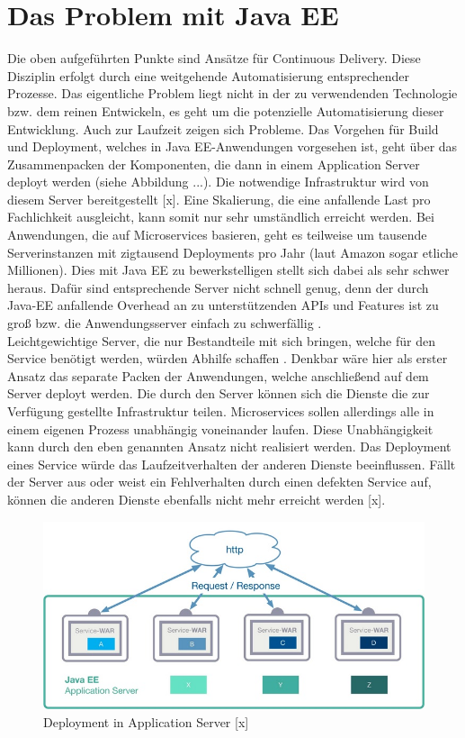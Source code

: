 \section{Das Problem mit Java EE}
Die oben aufgeführten Punkte sind Ansätze für Continuous Delivery. Diese Disziplin erfolgt durch eine weitgehende Automatisierung entsprechender Prozesse. Das eigentliche Problem liegt nicht in der zu verwendenden Technologie bzw. dem reinen Entwickeln, es geht um die potenzielle Automatisierung dieser Entwicklung. Auch zur Laufzeit zeigen sich Probleme. Das Vorgehen für Build und Deployment, welches in Java EE-Anwendungen vorgesehen ist, geht über das Zusammenpacken der Komponenten, die dann in einem Application Server deployt werden (siehe Abbildung ...). Die notwendige Infrastruktur wird von diesem Server bereitgestellt [x]. Eine Skalierung, die eine anfallende Last pro Fachlichkeit ausgleicht, kann somit nur sehr umständlich erreicht werden. Bei Anwendungen, die auf Microservices basieren, geht es teilweise um tausende Serverinstanzen mit zigtausend Deployments pro Jahr (laut Amazon sogar etliche Millionen). Dies mit Java EE zu bewerkstelligen stellt sich dabei als sehr schwer heraus. Dafür sind entsprechende Server nicht schnell genug, denn der durch Java-EE anfallende Overhead an zu unterstützenden APIs und Features ist zu groß bzw. die Anwendungsserver einfach zu schwerfällig  \cite{jaxcenter.2016}. \\ 
Leichtgewichtige Server, die nur Bestandteile mit sich bringen, welche für den Service benötigt werden, würden Abhilfe schaffen \cite{jaxcenter.2016}. Denkbar wäre hier als erster Ansatz das separate Packen der Anwendungen, welche anschließend auf dem Server deployt werden. Die durch den Server können sich die Dienste die zur Verfügung gestellte Infrastruktur teilen. Microservices sollen allerdings alle in einem eigenen Prozess unabhängig voneinander laufen. Diese Unabhängigkeit kann durch den eben genannten Ansatz nicht realisiert werden. Das Deployment eines Service würde das Laufzeitverhalten der anderen Dienste beeinflussen. Fällt der Server aus oder weist ein Fehlverhalten durch einen defekten Service auf, können die anderen Dienste ebenfalls nicht mehr erreicht werden [x].\\
\begin{figure}[h!]
	\centering
	\includegraphics[width=1.0\linewidth]{images/mp1}
	\caption{Deployment in Application Server [x]}
	\label{fig:mp1}
\end{figure}

